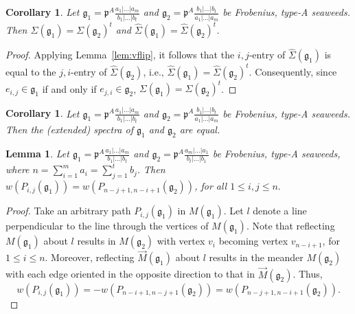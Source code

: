 \documentclass[letterpaper,10pt]{article}
\newtheorem{lemma}[theorem]{Lemma}
\newtheorem{corollary}[theorem]{Corollary}
\begin{document}
\begin{corollary}
Let $\mathfrak{g}_1=\mathfrak{p}^A\frac{a_1|\hdots|a_m}{b_1|\hdots|b_t}$ and $\mathfrak{g}_2=\mathfrak{p}^A\frac{b_1|\hdots|b_t}{a_1|\hdots|a_m}$ be Frobenius, type-A seaweeds. Then $\Sigma(\mathfrak{g}_1)=\Sigma(\mathfrak{g}_2)^t$ and $\widehat{\Sigma}(\mathfrak{g}_1)=\widehat{\Sigma}(\mathfrak{g}_2)^t$.
\end{corollary}
\begin{proof}
Applying Lemma~\ref{lem:vflip}, it follows that the $i,j$-entry of $\widehat{\Sigma}(\mathfrak{g}_1)$ is equal to the $j,i$-entry of $\widehat{\Sigma}(\mathfrak{g}_2)$, i.e., $\widehat{\Sigma}(\mathfrak{g}_1)=\widehat{\Sigma}(\mathfrak{g}_2)^t$. Consequently, since $e_{i,j}\in\mathfrak{g}_1$ if and only if $e_{j,i}\in\mathfrak{g}_2$, $\Sigma(\mathfrak{g}_1)=\Sigma(\mathfrak{g}_2)^t$.
\end{proof}

\begin{corollary}\label{cor:vfes}
Let $\mathfrak{g}_1=\mathfrak{p}^A\frac{a_1|\hdots|a_m}{b_1|\hdots|b_t}$ and $\mathfrak{g}_2=\mathfrak{p}^A\frac{b_1|\hdots|b_t}{a_1|\hdots|a_m}$ be Frobenius, type-A seaweeds. Then the \textup(extended\textup) spectra of $\mathfrak{g}_1$ and $\mathfrak{g}_2$ are equal.
\end{corollary}

\begin{lemma}\label{lem:hflip}
Let $\mathfrak{g}_1=\mathfrak{p}^A\frac{a_1|\hdots|a_m}{b_1|\hdots|b_t}$ and $\mathfrak{g}_2=\mathfrak{p}^A\frac{a_m|\hdots|a_1}{b_t|\hdots|b_1}$ be Frobenius, type-A seaweeds, where $n=\sum_{i=1}^ma_i=\sum_{j=1}^tb_j$. Then $w(P_{i,j}(\mathfrak{g}_1))=w(P_{n-j+1,n-i+1}(\mathfrak{g}_2))$, for all $1\leq i,j\leq n.$
\end{lemma}
\begin{proof}
Take an arbitrary path $P_{i,j}(\mathfrak{g}_1)$ in $M(\mathfrak{g}_1)$. Let $l$ denote a line perpendicular to the line through the vertices of $M(\mathfrak{g}_1)$. Note that reflecting $M(\mathfrak{g}_1)$ about $l$ results in $M(\mathfrak{g}_2)$ with vertex $v_i$ becoming vertex $v_{n-i+1}$, for $1\le i\le n$. Moreover, reflecting $\overrightarrow{M}(\mathfrak{g}_1)$ about $l$ results in the meander $M(\mathfrak{g}_2)$ with each edge oriented in the opposite direction to that in $\overrightarrow{M}(\mathfrak{g}_2)$. Thus, $$w(P_{i,j}(\mathfrak{g}_1))=-w(P_{n-i+1,n-j+1}(\mathfrak{g}_2))=w(P_{n-j+1,n-i+1}(\mathfrak{g}_2)).$$
\end{proof}
\end{document}

